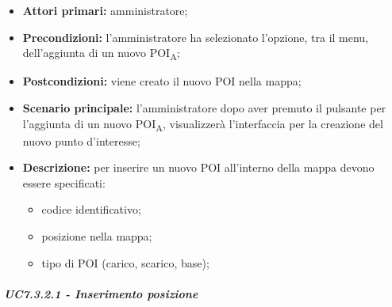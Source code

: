 \begin{itemize}

   \item   \textbf{Attori primari:} amministratore;

   \item   \textbf{Precondizioni:} l'amministratore ha selezionato l'opzione, tra il menu, dell'aggiunta di un nuovo POI\textsubscript{A};

  \item   \textbf{Postcondizioni:} viene creato il nuovo POI nella mappa;

   \item   \textbf{Scenario principale:} l'amministratore dopo aver premuto il pulsante per l'aggiunta di un nuovo POI\textsubscript{A}, visualizzerà l'interfaccia per la creazione del nuovo punto d'interesse;

  \item   \textbf{Descrizione:} per inserire un nuovo POI all'interno della mappa devono essere specificati:

  \begin{itemize}

       \item codice identificativo;

       \item posizione nella mappa;

       \item tipo di POI (carico, scarico, base);

   \end{itemize}

\end{itemize}



\subparagraph{UC7.3.2.1 - Inserimento posizione}

